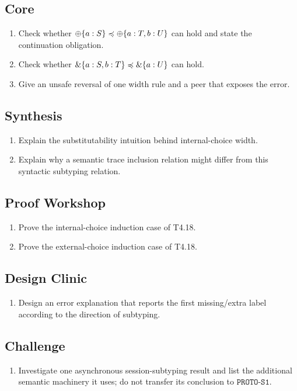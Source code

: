 \subsection*{Core}
\begin{enumerate}[label=\textbf{10.\arabic*},start=4]
\item Check whether $\oplus\{a:S\}\preccurlyeq\oplus\{a:T,b:U\}$ can hold and state the continuation obligation.
\item Check whether $\&\{a:S,b:T\}\preccurlyeq\&\{a:U\}$ can hold.
\item Give an unsafe reversal of one width rule and a peer that exposes the error.
\end{enumerate}
\subsection*{Synthesis}
\begin{enumerate}[label=\textbf{10.\arabic*},start=7]
\item Explain the substitutability intuition behind internal-choice width.
\item Explain why a semantic trace inclusion relation might differ from this syntactic subtyping relation.
\end{enumerate}
\subsection*{Proof Workshop}
\begin{enumerate}[label=\textbf{10.\arabic*},start=9]
\item Prove the internal-choice induction case of T4.18.
\item Prove the external-choice induction case of T4.18.
\end{enumerate}
\subsection*{Design Clinic}
\begin{enumerate}[label=\textbf{10.\arabic*},start=11]
\item Design an error explanation that reports the first missing/extra label according to the direction of subtyping.
\end{enumerate}
\subsection*{Challenge}
\begin{enumerate}[label=\textbf{10.\arabic*},start=12]
\item Investigate one asynchronous session-subtyping result and list the additional semantic machinery it uses; do not transfer its conclusion to $\texttt{PROTO-S1}$.
\end{enumerate}
